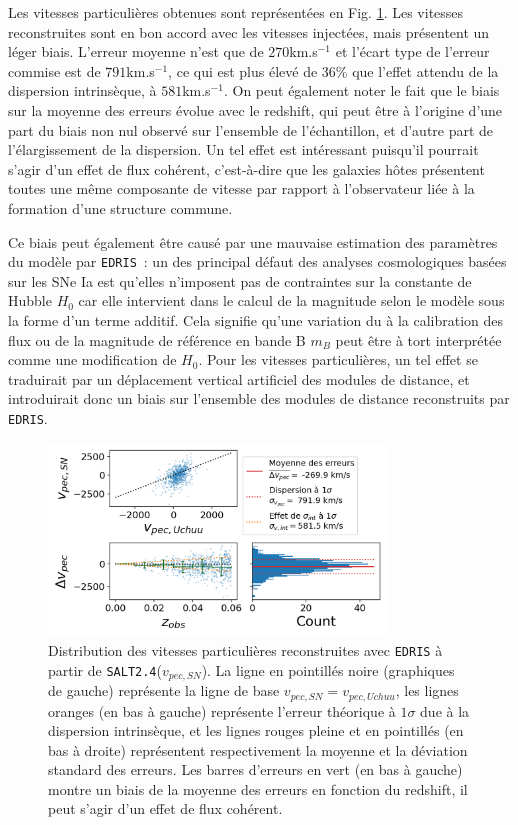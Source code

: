 \documentclass{book}
\def\edris{\texttt{EDRIS}\xspace}
\def\saltd{\texttt{SALT2.4}\xspace}
\begin{document}
Les vitesses particulières obtenues sont représentées en Fig. \ref{fig:vp_salt}. Les vitesses reconstruites sont en bon accord avec les vitesses injectées, mais présentent un léger biais. L'erreur moyenne n'est que de $270$km.s$^{-1}$ et l'écart type de l'erreur commise est de $791$km.s$^{-1}$, ce qui est plus élevé de 36\% que l'effet attendu de la dispersion intrinsèque, à $581$km.s$^{-1}$. On peut également noter le fait que le biais sur la moyenne des erreurs évolue avec le redshift, qui peut être à l'origine d'une part du biais non nul observé sur l'ensemble de l'échantillon, et d'autre part de l'élargissement de la dispersion. Un tel effet est intéressant puisqu'il pourrait s'agir d'un effet de flux cohérent, c'est-à-dire que les galaxies hôtes présentent toutes une même composante de vitesse par rapport à l'observateur liée à la formation d'une structure commune.

Ce biais peut également être causé par une mauvaise estimation des paramètres du modèle par \edris~: un des principal défaut des analyses cosmologiques basées sur les SNe Ia est qu'elles n'imposent pas de contraintes sur la constante de Hubble $H_0$ car elle intervient dans le calcul de la magnitude selon le modèle sous la forme d'un terme additif. Cela signifie qu'une variation du à la calibration des flux ou de la magnitude de référence en bande B $m_B$ peut être à tort interprétée comme une modification de $H_0$. Pour les vitesses particulières, un tel effet se traduirait par un déplacement vertical artificiel des modules de distance, et introduirait donc un biais sur l'ensemble des modules de distance reconstruits par \edris.

\begin{figure}[h]
	\centering
	\includegraphics[width=0.8\textwidth]{figures/vp_salt.png}
	\caption{Distribution des vitesses particulières reconstruites avec \edris à partir de \saltd ($v_{pec,SN}$). La ligne en pointillés noire (graphiques de gauche) représente la ligne de base $v_{pec, SN} = v_{pec, Uchuu}$, les lignes oranges (en bas à gauche) représente l'erreur théorique à $1\sigma$ due à la dispersion intrinsèque, et les lignes rouges pleine et en pointillés (en bas à droite) représentent respectivement la moyenne et la déviation standard des erreurs. Les barres d'erreurs en vert (en bas à gauche) montre un biais de la moyenne des erreurs en fonction du redshift, il peut s'agir d'un effet de flux cohérent.}
	\label{fig:vp_salt}
\end{figure}
\end{document}
